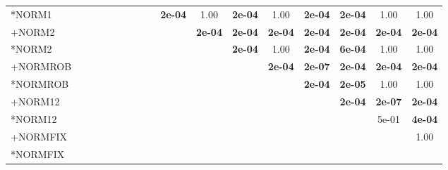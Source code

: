 \begin{table}[t]
{\begin{tabular}{lcccccccccccccccc}
*NORM1 &  &  &  &  &  &  &  &  & \textbf{2e-04} & 1.00 & \textbf{2e-04} & 1.00 & \textbf{2e-04} & \textbf{2e-04} & 1.00 & 1.00 \\
+NORM2 &  &  &  &  &  &  &  &  &  & \textbf{2e-04} & \textbf{2e-04} & \textbf{2e-04} & \textbf{2e-04} & \textbf{2e-04} & \textbf{2e-04} & \textbf{2e-04} \\
*NORM2 &  &  &  &  &  &  &  &  &  &  & \textbf{2e-04} & 1.00 & \textbf{2e-04} & \textbf{6e-04} & 1.00 & 1.00 \\
+NORMROB &  &  &  &  &  &  &  &  &  &  &  & \textbf{2e-04} & \textbf{2e-07} & \textbf{2e-04} & \textbf{2e-04} & \textbf{2e-04} \\
*NORMROB &  &  &  &  &  &  &  &  &  &  &  &  & \textbf{2e-04} & \textbf{2e-05} & 1.00 & 1.00 \\
+NORM12 &  &  &  &  &  &  &  &  &  &  &  &  &  & \textbf{2e-04} & \textbf{2e-07} & \textbf{2e-04} \\
*NORM12 &  &  &  &  &  &  &  &  &  &  &  &  &  &  & 5e-01 & \textbf{4e-04} \\
+NORMFIX &  &  &  &  &  &  &  &  &  &  &  &  &  &  &  & 1.00 \\
*NORMFIX &  &  &  &  &  &  &  &  &  &  &  &  &  &  &  &  \\
\bottomrule
\end{tabular}
}
\end{table}
